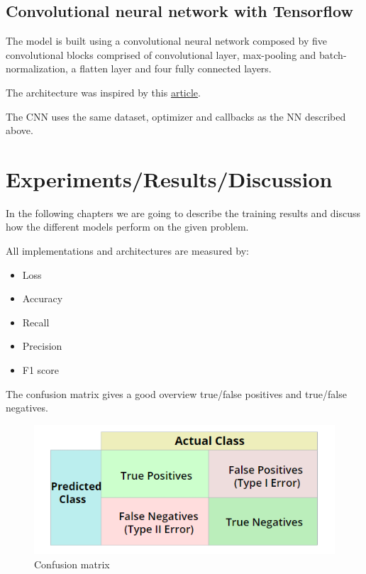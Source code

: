 \documentclass{article}
\begin{document}
\subsection{Convolutional neural network with Tensorflow}
\label{sec:convolutional_neural_network_with_tensorflow}

The model is built using a convolutional neural network composed by five convolutional blocks comprised of convolutional layer, 
max-pooling and batch-normalization, a flatten layer and four fully connected layers.

The architecture was inspired by this \href{https://towardsdatascience.com/deep-learning-for-detecting-pneumonia-from-x-ray-images-fc9a3d9fdba8}{article}.

The CNN uses the same dataset, optimizer and callbacks as the NN described above.

\section{Experiments/Results/Discussion}

In the following chapters we are going to describe the training results and discuss how the 
different models perform on the given problem.

All implementations and architectures are measured by:

\begin{itemize}
  \item Loss
  \item Accuracy
  \item Recall
  \item Precision
  \item F1 score
\end{itemize}

The confusion matrix gives a good overview true/false positives and true/false negatives.

\begin{figure}[ht]
  \centering
  \includegraphics[scale=1]{images/confusionMatrix.png}
  \caption{Confusion matrix}
  \label{fig:confusion_matrix}
\end{figure}
\end{document}
